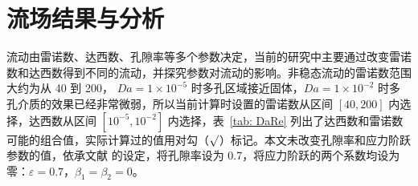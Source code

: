 \chapter{流场结果与分析}\label{chap: flow pattern}

流动由雷诺数、达西数、孔隙率等多个参数决定，当前的研究中主要通过改变雷诺数和达西数得到不同的流动，并探究参数对流动的影响。非稳态流动的雷诺数范围大约为从 40 到 200， $Da=1\times 10^{-5}$ 时多孔区域接近固体，$Da=1\times 10^{-2}$ 时多孔介质的效果已经非常微弱，所以当前计算时设置的雷诺数从区间 $[40,200]$ 内选择，达西数从区间 $[10^{-5},10^{-2}]$ 内选择，表~\ref{tab: DaRe} 列出了达西数和雷诺数可能的组合值，实际计算过的值用对勾（$\surd$）标记。本文未改变孔隙率和应力阶跃参数的值，依承文献  的设定，将孔隙率设为 0.7，将应力阶跃的两个系数均设为零：$\varepsilon=0.7$，$\beta_1 = \beta_2=0$。

